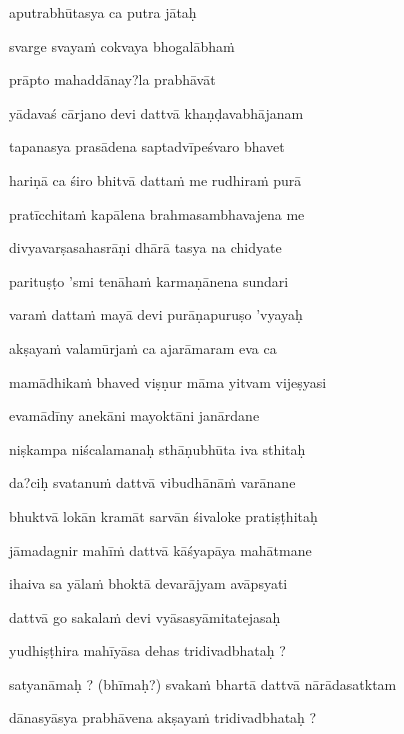 \nemslokab 
aputrabhūtasya ca putra jātaḥ \danda\dontdisplaylinenum

\nemslokac 
svarge svaya\.m cokvaya bhogalābha\.m
\dontdisplaylinenum

\nemslokad 
prāpto mahaddānay?la prabhāvāt \veg\dontdisplaylinenum

\vers

yādavaś cārjano devi dattvā khaṇḍavabhājanam \veg\dontdisplaylinenum

tapanasya prasādena saptadvīpeśvaro bhavet\thinspace{\dandab} \dontdisplaylinenum

hariṇā ca śiro bhitvā datta\.m me rudhira\.m purā \veg\dontdisplaylinenum

pratīcchita\.m kapālena brahmasambhavajena me\thinspace{\dandab} \dontdisplaylinenum

divyavarṣasahasrāṇi dhārā tasya na chidyate \veg\dontdisplaylinenum

parituṣṭo 'smi tenāha\.m karmaṇānena sundari\thinspace{\dandab} \dontdisplaylinenum

vara\.m datta\.m mayā devi purāṇapuruṣo 'vyayaḥ \veg\dontdisplaylinenum

akṣaya\.m valamūrja\.m ca ajarāmaram eva ca\thinspace{\dandab} \dontdisplaylinenum

mamādhika\.m bhaved viṣṇur māma yitvam vijeṣyasi \veg\dontdisplaylinenum

evamādīny anekāni mayoktāni janārdane\thinspace{\dandab} \dontdisplaylinenum

niṣkampa niścalamanaḥ sthāṇubhūta iva sthitaḥ \veg\dontdisplaylinenum

da?ciḥ svatanu\.m dattvā vibudhānā\.m varānane\thinspace{\dandab} \dontdisplaylinenum

bhuktvā lokān kramāt sarvān śivaloke pratiṣṭhitaḥ \veg\dontdisplaylinenum

jāmadagnir mahī\.m dattvā kāśyapāya mahātmane\thinspace{\dandab} \dontdisplaylinenum

ihaiva sa yāla\.m bhoktā devarājyam avāpsyati \veg\dontdisplaylinenum 

dattvā go sakala\.m devi vyāsasyāmitatejasaḥ\thinspace{\dandab} \dontdisplaylinenum

yudhiṣṭhira mahīyāsa dehas tridivadbhataḥ \veg\dontdisplaylinenum ?

satyanāmaḥ ? (bhīmaḥ?) svaka\.m bhartā dattvā nārādasatktam\thinspace{\dandab} \dontdisplaylinenum

dānasyāsya prabhāvena akṣaya\.m tridivadbhataḥ ? \veg\dontdisplaylinenum


